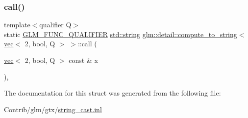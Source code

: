 \subsubsection{\texorpdfstring{call()}{call()}}
{\footnotesize\ttfamily template$<$qualifier Q$>$ \\
static \mbox{\hyperlink{setup_8hpp_a33fdea6f91c5f834105f7415e2a64407}{G\+L\+M\+\_\+\+F\+U\+N\+C\+\_\+\+Q\+U\+A\+L\+I\+F\+I\+ER}} \mbox{\hyperlink{_s_d_l__opengl__glext_8h_ae84541b4f3d8e1ea24ec0f466a8c568b}{std\+::string}} \mbox{\hyperlink{structglm_1_1detail_1_1compute__to__string}{glm\+::detail\+::compute\+\_\+to\+\_\+string}}$<$ \mbox{\hyperlink{structglm_1_1vec}{vec}}$<$ 2, bool, Q $>$ $>$\+::call (\begin{DoxyParamCaption}\item[{\mbox{\hyperlink{structglm_1_1vec}{vec}}$<$ 2, bool, Q $>$ const \&}]{x }\end{DoxyParamCaption})\hspace{0.3cm}{\ttfamily [inline]}, {\ttfamily [static]}}



The documentation for this struct was generated from the following file\+:\begin{DoxyCompactItemize}
\item 
Contrib/glm/gtx/\mbox{\hyperlink{string__cast_8inl}{string\+\_\+cast.\+inl}}\end{DoxyCompactItemize}
